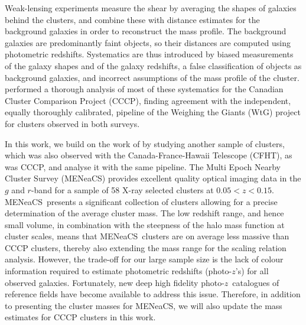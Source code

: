 \documentclass[useAMS,usenatbib]{mnras}
\newcommand{\mn}{MENeaCS}
\newcommand{\pz}{photo-$z$}
\begin{document}
Weak-lensing experiments measure the shear by averaging the shapes of galaxies behind the clusters, and combine these with distance estimates for the background galaxies in order to reconstruct the mass profile. The background galaxies are predominantly faint objects, so their distances are computed using photometric redshifts. Systematics are thus introduced by biased measurements of the galaxy shapes and of the galaxy redshifts, a false classification of objects as background galaxies, and incorrect assumptions of the mass profile of the cluster. 
\citet[ hereafter ]{hoekstra15} performed a thorough analysis of most of these systematics for the Canadian Cluster Comparison Project (CCCP), finding agreement with the independent, equally thoroughly calibrated, pipeline of the Weighing the Giants (WtG) project \citep{vonderlinden14, applegate14} for clusters observed in both surveys. 



In this work, we build on the work of  by studying another sample of clusters, which was also observed with the Canada-France-Hawaii Telescope (CFHT), as was CCCP, and analyse it with the same pipeline. The Multi Epoch Nearby Cluster Survey (\mn) provides excellent quality optical imaging data in the $g$ and $r$-band for a sample of 58 X-ray selected clusters at $0.05<z<0.15$. \mn \ presents a significant collection of clusters allowing for a precise determination of the average cluster mass. The low redshift range, and hence small volume, in combination with the steepness of the halo mass function at cluster scales, means that \mn \ clusters are on average less massive than CCCP clusters, thereby also extending the mass range for the scaling relation analysis. However, the trade-off for our large sample size is the lack of colour information required to estimate photometric redshifts (\pz's) for all observed galaxies. Fortunately, new deep high fidelity \pz \ catalogues of reference fields have become available to address this issue. Therefore, in addition to presenting the cluster masses for \mn, we will also update the mass estimates for CCCP clusters in this work.
\end{document}
